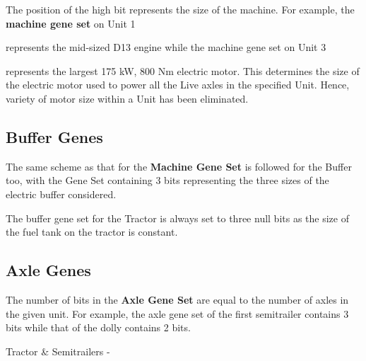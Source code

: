\documentclass[ExampleMasters.tex]{subfiles}
\begin{document}
			\centerline{}
			\vspace{0.1in}

			The position of the high bit represents the size of the machine. For example, the \textbf{machine gene set} on Unit 1\\

			\centerline{}
			\vspace{0.1in}

			represents the mid-sized D13 engine while the machine gene set on Unit 3\\

			\centerline{\framebox{0}}
			\vspace{0.1in}

			represents the largest 175 kW, 800 Nm electric motor. This determines the size of the electric motor used to power all the Live axles in the specified Unit. Hence, variety of motor size within a Unit has been eliminated.\\

		\subsection{Buffer Genes}
			The same scheme as that for the \textbf{Machine Gene Set} is followed for the Buffer too, with the Gene Set containing 3 bits representing the three sizes of the electric buffer considered.\\

			\centerline{}
			\vspace{0.1in}

			The buffer gene set for the Tractor is always set to three null bits as the size of the fuel tank on the tractor is constant.\\

		\subsection{Axle Genes}
			The number of bits in the \textbf{Axle Gene Set} are equal to the number of axles in the given unit. For example, the axle gene set of the first semitrailer contains 3 bits while that of the dolly contains 2 bits.\\

			\centerline{Tractor \& Semitrailers - }
			\vspace{0.1in}
\end{document}

